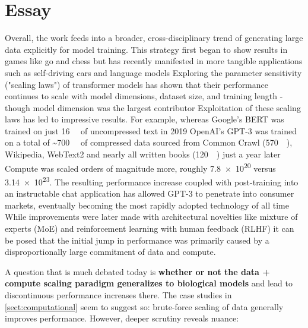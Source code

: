 \section{Essay}
Overall, the work feeds into a broader, cross-disciplinary trend of generating large data explicitly for model training. This strategy first began to show results in games like go and chess but has recently manifested in more tangible applications such as self-driving cars and language models Exploring the parameter sensitivity ("scaling laws") of transformer models has shown that their performance continues to scale with model dimensions, dataset size, and training length - though model dimension was the largest contributor Exploitation of these scaling laws has led to impressive results. For example, whereas Google's BERT was trained on just \SI{16}{\giga\byte} of uncompressed text in 2019 OpenAI's GPT-3 was trained on a total of \textasciitilde{\SI{700}{\giga\byte}} of compressed data sourced from Common Crawl (\SI{570}{\giga\byte}), Wikipedia, WebText2 and nearly all written books (\SI{120}{\giga\byte}) just a year later Compute was scaled orders of magnitude more, roughly \SI{7.8e20}{\flops} versus \SI{3.14e23}{\flops}. The resulting performance increase coupled with post-training into an instructable chat application has allowed GPT-3 to penetrate into consumer markets, eventually becoming the most rapidly adopted technology of all time While improvements were later made with architectural novelties like mixture of experts (MoE) and reinforcement learning with human feedback (RLHF) it can be posed that the initial jump in performance was primarily caused by a disproportionally large commitment of data and compute.

A question that is much debated today is \textbf{whether or not the data + compute scaling paradigm generalizes to biological models} and lead to discontinuous performance increases there. The case studies in \autoref{sect:computational} seem to suggest so: brute-force scaling of data generally improves performance. However, deeper scrutiny reveals nuance:

